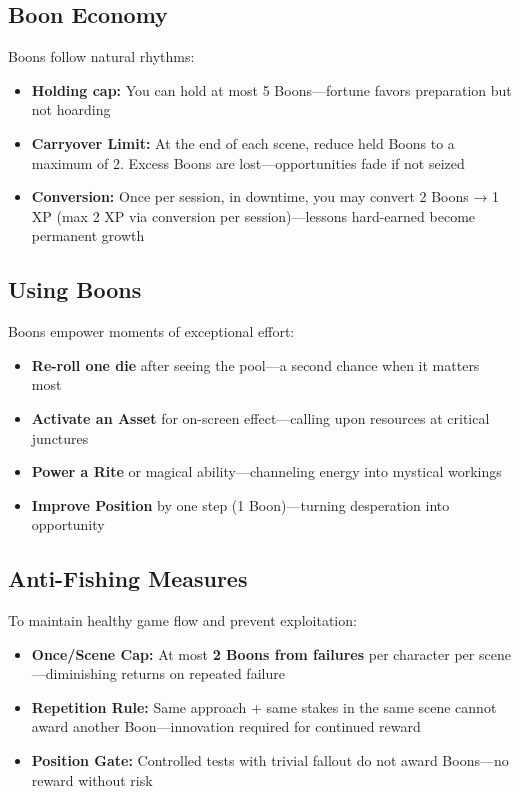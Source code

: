 \subsection*{Boon Economy}

Boons follow natural rhythms:

\begin{itemize}
    \item \textbf{Holding cap:} You can hold at most 5 Boons—fortune favors preparation but not hoarding
    \item \textbf{Carryover Limit:} At the end of each scene, reduce held Boons to a maximum of 2. Excess Boons are lost—opportunities fade if not seized
    \item \textbf{Conversion:} Once per session, in downtime, you may convert 2 Boons → 1 XP (max 2 XP via conversion per session)—lessons hard-earned become permanent growth
\end{itemize}

\subsection*{Using Boons}

Boons empower moments of exceptional effort:

\begin{itemize}
    \item \textbf{Re-roll one die} after seeing the pool—a second chance when it matters most
    \item \textbf{Activate an Asset} for on-screen effect—calling upon resources at critical junctures
    \item \textbf{Power a Rite} or magical ability—channeling energy into mystical workings
    \item \textbf{Improve Position} by one step (1 Boon)—turning desperation into opportunity
\end{itemize}

\subsection*{Anti-Fishing Measures}

To maintain healthy game flow and prevent exploitation:

\begin{itemize}
    \item \textbf{Once/Scene Cap:} At most \textbf{2 Boons from failures} per character per scene—diminishing returns on repeated failure
    \item \textbf{Repetition Rule:} Same approach + same stakes in the same scene cannot award another Boon—innovation required for continued reward
    \item \textbf{Position Gate:} Controlled tests with trivial fallout do not award Boons—no reward without risk
\end{itemize}

